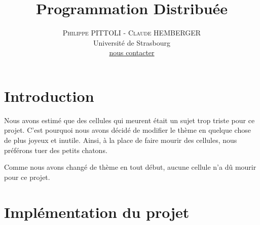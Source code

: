 \documentclass[twoside]{article}
\title{\vspace{-15mm}\fontsize{24pt}{10pt}\selectfont\textbf{Programmation Distribuée}}
\author{
\large
\textsc{Philippe PITTOLI - Claude HEMBERGER}\\[2mm]
\normalsize Université de Strasbourg \\ 
\normalsize \href{mailto:philippe.pittoli@etu.unistra.fr}{nous contacter}
\vspace{-5mm}
}
\date{}
\begin{document}
\maketitle %

\thispagestyle{fancy} %



\section{Introduction}
Nous avons estimé que des cellules qui meurent était un sujet trop triste pour ce projet.
C'est pourquoi nous avons décidé de modifier le thème en quelque chose de plus joyeux et inutile.
Ainsi, à la place de faire mourir des cellules, nous préférons tuer des petits chatons.

Comme nous avons changé de thème en tout début, aucune cellule n'a dû mourir pour ce projet.

\section{Implémentation du projet}
\end{document}
